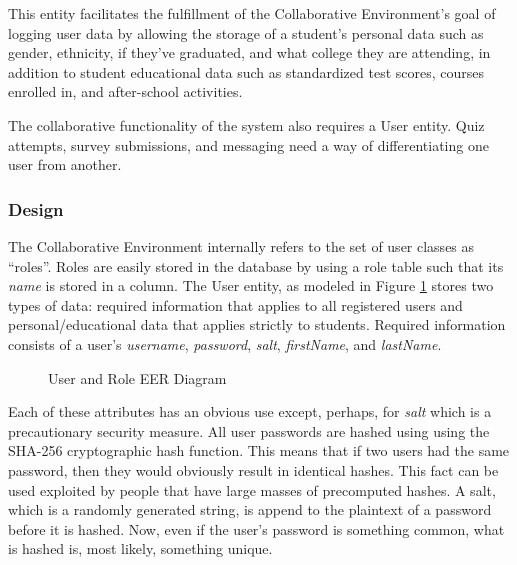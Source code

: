 	This entity facilitates the fulfillment of the Collaborative Environment's goal of logging user data by allowing the storage of a student's personal data such as gender, ethnicity, if they've graduated, and what college they are attending, in addition to student educational data such as standardized test scores, courses enrolled in, and after-school activities.

The collaborative functionality of the system also requires a User entity. Quiz attempts, survey submissions, and messaging need a way of differentiating one user from another.

\subsubsection{Design}
The Collaborative Environment internally refers to the set of user classes as ``roles''. Roles are easily stored in the database by using a role table such that its \emph{name} is stored in a column. The User entity, as modeled in Figure \ref{fig:er-user} stores two types of data: required information that applies to all registered users and personal/educational data that applies strictly to students. Required information consists of a user's \emph{username}, \emph{password}, \emph{salt}, \emph{firstName}, and \emph{lastName}.

\begin{figure}[h!]
	\centering
	\caption{User and Role EER Diagram}
	\label{fig:er-user}
\end{figure}

Each of these attributes has an obvious use except, perhaps, for \emph{salt} which is a precautionary security measure. All user passwords are hashed using using the SHA-256 cryptographic hash function. This means that if two users had the same password, then they would obviously result in identical hashes. This fact can be used exploited by people that have large masses of precomputed hashes. A salt, which is a randomly generated string, is append to the plaintext of a password before it is hashed. Now, even if the user's password is something common, what is hashed is, most likely, something unique.

